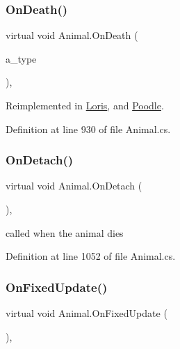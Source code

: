 \subsubsection{\texorpdfstring{On\+Death()}{OnDeath()}}
{\footnotesize\ttfamily virtual void Animal.\+On\+Death (\begin{DoxyParamCaption}\item[{\mbox{\hyperlink{_animal_8cs_aa09ea87b75a706096f010aef7b9b1826}{D\+E\+A\+T\+H\+\_\+\+T\+Y\+PE}}}]{a\+\_\+type }\end{DoxyParamCaption})\hspace{0.3cm}{\ttfamily [protected]}, {\ttfamily [virtual]}}



Reimplemented in \mbox{\hyperlink{class_loris_a9edf28bf01dbd817175b366f471a4dda}{Loris}}, and \mbox{\hyperlink{class_poodle_a86cc87a183e2b7b2297d9481c2c0d416}{Poodle}}.



Definition at line 930 of file Animal.\+cs.

\mbox{\label{class_animal_aeea0f2bdfa40b980440c8a4ff4820479}} 
\subsubsection{\texorpdfstring{On\+Detach()}{OnDetach()}}
{\footnotesize\ttfamily virtual void Animal.\+On\+Detach (\begin{DoxyParamCaption}{ }\end{DoxyParamCaption})\hspace{0.3cm}{\ttfamily [protected]}, {\ttfamily [virtual]}}



called when the animal dies 



Definition at line 1052 of file Animal.\+cs.

\mbox{\label{class_animal_aebce764681f2a949d72b80766beb0752}} 
\subsubsection{\texorpdfstring{On\+Fixed\+Update()}{OnFixedUpdate()}}
{\footnotesize\ttfamily virtual void Animal.\+On\+Fixed\+Update (\begin{DoxyParamCaption}{ }\end{DoxyParamCaption})\hspace{0.3cm}{\ttfamily [protected]}, {\ttfamily [virtual]}}



